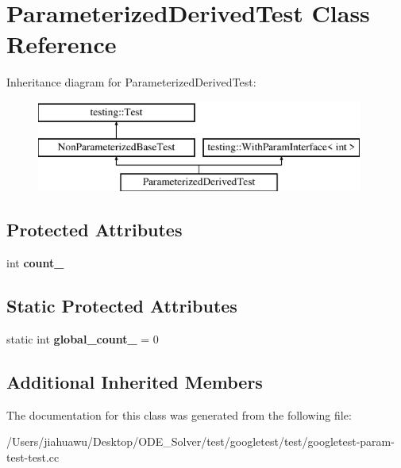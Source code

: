 \hypertarget{class_parameterized_derived_test}{}\section{Parameterized\+Derived\+Test Class Reference}
\label{class_parameterized_derived_test}
Inheritance diagram for Parameterized\+Derived\+Test\+:\begin{figure}[H]
\begin{center}
\leavevmode
\includegraphics[height=3.000000cm]{class_parameterized_derived_test}
\end{center}
\end{figure}
\subsection*{Protected Attributes}
\begin{DoxyCompactItemize}
\item 
\mbox{\label{class_parameterized_derived_test_ad8a2968265e7477c13585d17bbd0492c}} 
int {\bfseries count\+\_\+}
\end{DoxyCompactItemize}
\subsection*{Static Protected Attributes}
\begin{DoxyCompactItemize}
\item 
\mbox{\label{class_parameterized_derived_test_ab6c067a099764a9d58b5f2e8ebcb5d0f}} 
static int {\bfseries global\+\_\+count\+\_\+} = 0
\end{DoxyCompactItemize}
\subsection*{Additional Inherited Members}


The documentation for this class was generated from the following file\+:\begin{DoxyCompactItemize}
\item 
/\+Users/jiahuawu/\+Desktop/\+O\+D\+E\+\_\+\+Solver/test/googletest/test/googletest-\/param-\/test-\/test.\+cc\end{DoxyCompactItemize}
